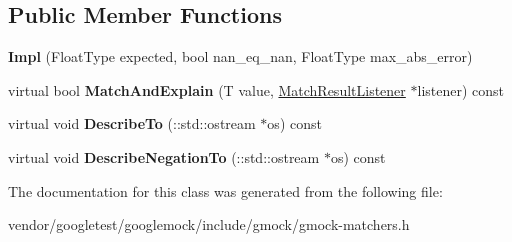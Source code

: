 \subsection*{Public Member Functions}
\begin{DoxyCompactItemize}
\item 
{\bfseries Impl} (Float\+Type expected, bool nan\+\_\+eq\+\_\+nan, Float\+Type max\+\_\+abs\+\_\+error)\hypertarget{classtesting_1_1internal_1_1FloatingEqMatcher_1_1Impl_a314057e171f872ad478b3e143121aecd}{}\label{classtesting_1_1internal_1_1FloatingEqMatcher_1_1Impl_a314057e171f872ad478b3e143121aecd}

\item 
virtual bool {\bfseries Match\+And\+Explain} (T value, \hyperlink{classtesting_1_1MatchResultListener}{Match\+Result\+Listener} $\ast$listener) const \hypertarget{classtesting_1_1internal_1_1FloatingEqMatcher_1_1Impl_af44c07dae0a5ccf6d9d7cfef077ad678}{}\label{classtesting_1_1internal_1_1FloatingEqMatcher_1_1Impl_af44c07dae0a5ccf6d9d7cfef077ad678}

\item 
virtual void {\bfseries Describe\+To} (\+::std\+::ostream $\ast$os) const \hypertarget{classtesting_1_1internal_1_1FloatingEqMatcher_1_1Impl_a9cbacc70992f4776a9785716546f13a2}{}\label{classtesting_1_1internal_1_1FloatingEqMatcher_1_1Impl_a9cbacc70992f4776a9785716546f13a2}

\item 
virtual void {\bfseries Describe\+Negation\+To} (\+::std\+::ostream $\ast$os) const \hypertarget{classtesting_1_1internal_1_1FloatingEqMatcher_1_1Impl_ab8799175394f311082142850717dabd0}{}\label{classtesting_1_1internal_1_1FloatingEqMatcher_1_1Impl_ab8799175394f311082142850717dabd0}

\end{DoxyCompactItemize}


The documentation for this class was generated from the following file\+:\begin{DoxyCompactItemize}
\item 
vendor/googletest/googlemock/include/gmock/gmock-\/matchers.\+h\end{DoxyCompactItemize}
